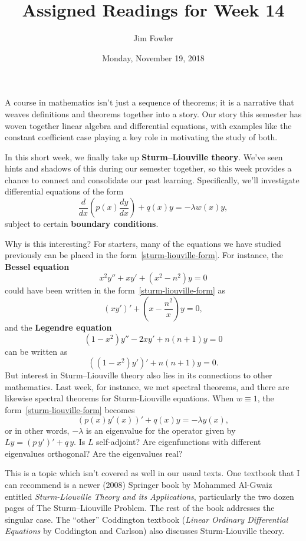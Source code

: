 \documentclass{homework}
\author{Jim Fowler}
\title{Assigned Readings for Week 14}
\date{Monday, November 19, 2018}
\begin{document}
\maketitle

A course in mathematics isn't just a sequence of theorems; it is a
narrative that weaves definitions and theorems together into a story.
Our story this semester has woven together linear algebra and
differential equations, with examples like the constant coefficient
case playing a key role in motivating the study of both.

In this short week, we finally take up \textbf{Sturm–Liouville
  theory}.  We've seen hints and shadows of this during our semester
together, so this week provides a chance to connect and consolidate
our past learning.  Specifically, we'll investigate differential equations of the form
\begin{equation*}\label{sturm-liouville-form}\tag{$*$}
{ {\frac {d }{d x}}\left( p(x){\frac { {d} y}{ {d} x}}\right)+q(x)y=-\lambda w(x)y,} \end{equation*}
subject to certain \textbf{boundary conditions}.

Why is this interesting?  For starters, many of the equations we have studied previously can be placed in the form~\eqref{sturm-liouville-form}.  For instance, the \textbf{Bessel equation}
\[  x^{2}y''+xy'+\left(x^{2}-n^{2}\right)y=0
\]
could have been written in the form~\eqref{sturm-liouville-form} as
\[
  {\displaystyle \left(xy'\right)'+\left(x-{\frac {n ^{2}}{x}}\right)y=0,}
\]
and the \textbf{Legendre equation}
\[
{\displaystyle \left(1-x^{2}\right)y''-2xy'+n (n +1)y=0}
\]
can be written as
\[
  {\displaystyle \left(\left(1-x^{2}\right)y'\right)'+n (n +1)y=0}.
\]
But interest in Sturm–Liouville theory also lies in its connections to other mathematics.  Last week, for instance, we met spectral theorems, and there are likewise spectral theorems for Sturm-Liouville equations.  When $w \equiv 1$, the form~\eqref{sturm-liouville-form} becomes
\[
  \left( p(x) y'(x) \right)'+q(x)y=-\lambda y(x),
\]
or in other words, $-\lambda$ is an eigenvalue for the operator given by $Ly = \left( p \, y' \right)'+q \, y$.  Is $L$ self-adjoint?  Are eigenfunctions with different eigenvalues orthogonal?  Are the eigenvalues real?  

This is a topic which isn't covered as well in our usual texts.  One
textbook that I can recommend is a newer (2008) Springer book by
Mohammed Al-Gwaiz entitled \textit{Sturm-Liouville Theory and its
  Applications}, particularly the two dozen pages of 
The Sturm–Liouville Problem.  The rest of the book addresses the
singular case.  The ``other'' Coddington textbook (\textit{Linear
  Ordinary Differential Equations} by Coddington and Carlson) also
discusses Sturm-Liouville theory.

\end{document}
